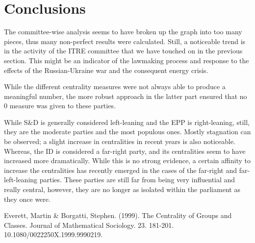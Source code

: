 \documentclass[lettersize,journal]{IEEEtran}
\begin{document}
\section{Conclusions} \label{sec:conclusions}
The committee-wise analysis seems to have broken up the graph into too many pieces, thus many non-perfect results were calculated. Still, a noticeable trend is in the activity of the ITRE committee that we have touched on in the previous section. This might be an indicator of the lawmaking process and response to the effects of the Russian-Ukraine war and the consequent energy crisis. 

While the different centrality measures were not always able to produce a meaningful number, the more robust approach in the latter part ensured that no 0 measure was given to these parties. 

While S\&D is generally considered left-leaning and the EPP is right-leaning, still, they are the moderate parties and the most populous ones. Mostly stagnation can be observed; a slight increase in centralities in recent years is also noticeable. Whereas, the ID is considered a far-right party, and its centralities seem to have increased more dramatically. While this is no strong evidence, a certain affinity to increase the centralities has recently emerged in the cases of the far-right and far-left-leaning parties. These parties are still far from being very influential and really central, however, they are no longer as isolated within the parliament as they once were.

\begin{thebibliography}{1}


Everett, Martin \& Borgatti, Stephen. (1999). The Centrality of Groups and Classes. Journal of Mathematical Sociology. 23. 181-201. 10.1080/0022250X.1999.9990219.


\end{thebibliography}
\end{document}

